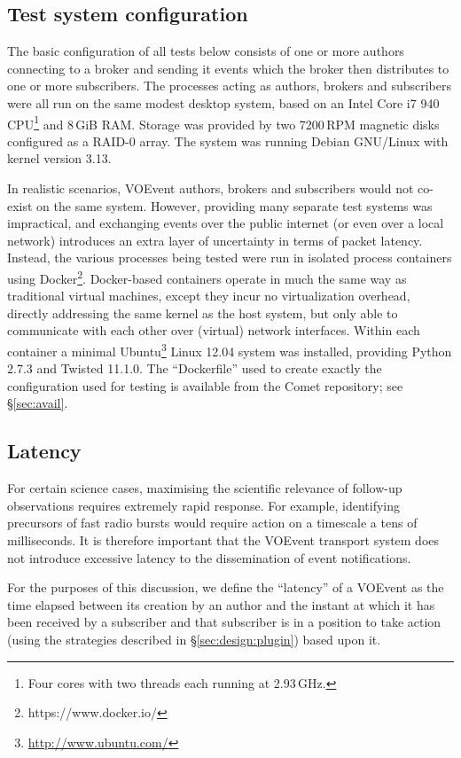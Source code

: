 \documentclass[5p,authoryear]{elsarticle}
\begin{document}
\subsection{Test system configuration}

The basic configuration of all tests below consists of one or more authors
connecting to a broker and sending it events which the broker then distributes
to one or more subscribers. The processes acting as authors, brokers and
subscribers were all run on the same modest desktop system, based on an Intel
Core i7 940 CPU\footnote{Four cores with two threads each running at
2.93\,GHz.}
and 8\,GiB RAM. Storage was provided by two 7200\,RPM magnetic disks
configured as a RAID-0 array. The system was running Debian GNU/Linux with kernel
version 3.13.

In realistic scenarios, VOEvent authors, brokers and subscribers would not
co-exist on the same system. However, providing many separate test systems was
impractical, and exchanging events over the public internet (or even over a
local network) introduces an extra layer of uncertainty in terms of packet
latency. Instead, the various processes being tested were run in isolated
process containers using Docker\footnote{https://www.docker.io/}. Docker-based
containers operate in much the same way as traditional virtual machines,
except they incur no virtualization overhead, directly addressing the same
kernel as the host system, but only able to communicate with each other over
(virtual) network interfaces.  Within each container a minimal
Ubuntu\footnote{\url{http://www.ubuntu.com/}} Linux 12.04 system was
installed, providing Python 2.7.3 and Twisted 11.1.0. The ``Dockerfile'' used
to create exactly the configuration used for testing is available from the
Comet repository; see \S\ref{sec:avail}.

\subsection{Latency}
\label{sec:perf:latency}

For certain science cases, maximising the scientific relevance of follow-up
observations requires extremely rapid response. For example, identifying
precursors of fast radio bursts \citep{Thornton:2013} would require action on
a timescale a tens of milliseconds. It is therefore important that the VOEvent
transport system does not introduce excessive latency to the dissemination of
event notifications.

For the purposes of this discussion, we define the ``latency'' of a VOEvent as
the time elapsed between its creation by an author and the instant at which it
has been received by a subscriber and that subscriber is in a position to take
action (using the strategies described in \S\ref{sec:design:plugin}) based
upon it.
\end{document}
